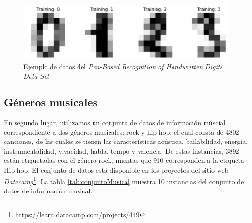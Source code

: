 \documentclass[runningheads]{llncs}
\begin{document}
\begin{figure}[h]
    \centering
    \includegraphics[scale=0.4]{img/digits.png}
    \caption{Ejemplo de datos del \textit{Pen-Based Recognition of Handwritten Digits Data Set}}
    \label{fig:digitsExample}
\end{figure}

\subsection{Géneros musicales}
En segundo lugar, utilizamos un conjunto de datos de información múscial correspondiente a dos géneros musicales: rock y hip-hop; el cual consta de 4802 canciones, de las cuales se tienen las características acústica, bailabilidad, energía, instrumentalidad, vivacidad, habla, tempo y  valencia. De estas instancias, 3892 están etiquetadas con el género rock, mientas que 910 corresponden a la etiqueta Hip-hop. El conjunto de datos está disponible en los proyectos del sitio web \textit{Datacamp}\footnote{https://learn.datacamp.com/projects/449}. La tabla \ref{tab:conjuntoMusica} muestra 10 instancias del conjunto de datos de información musical.
\end{document}
